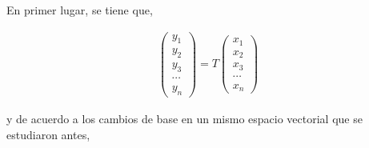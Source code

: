 \bigskip

\bigskip

\bigskip

En primer lugar, se tiene que, 

\bigskip

\begin{eqnarray}
\label{yTx}
\left(\begin{array}{c} y_{1} \\ y_{2}  
\\  y_3 \\ \cdots \\ y_{n} 
\end{array} \right)=T\left(\begin{array}{c} x_{1} \\ x_{2}  
\\  x_3 \\ \cdots \\ x_{n} 
\end{array} \right)
\end{eqnarray}

\bigskip

\noindent
y de acuerdo a los cambios de base en un mismo espacio vectorial que se estudiaron antes, 


